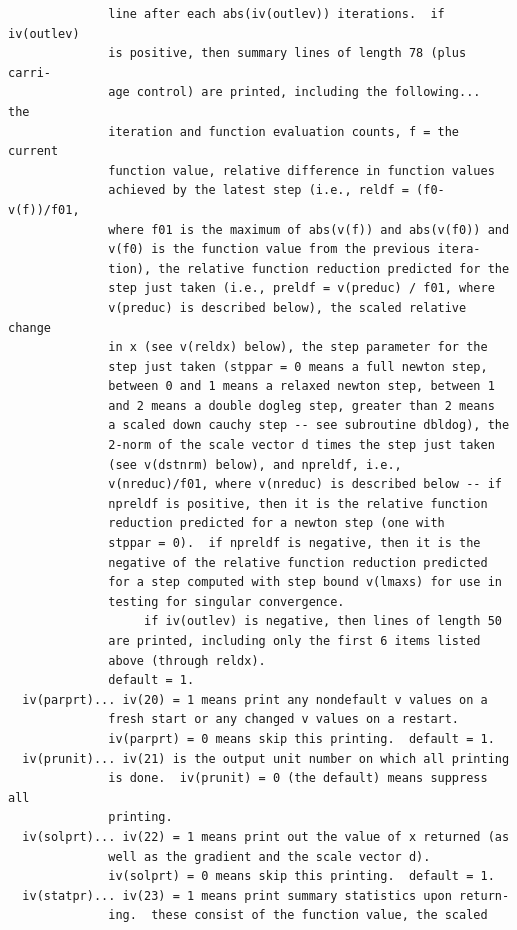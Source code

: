 \documentclass[11pt,twoside]{article}
\begin{document}
\begin{verbatim}
              line after each abs(iv(outlev)) iterations.  if iv(outlev)
              is positive, then summary lines of length 78 (plus carri-
              age control) are printed, including the following...  the
              iteration and function evaluation counts, f = the current
              function value, relative difference in function values
              achieved by the latest step (i.e., reldf = (f0-v(f))/f01,
              where f01 is the maximum of abs(v(f)) and abs(v(f0)) and
              v(f0) is the function value from the previous itera-
              tion), the relative function reduction predicted for the
              step just taken (i.e., preldf = v(preduc) / f01, where
              v(preduc) is described below), the scaled relative change
              in x (see v(reldx) below), the step parameter for the
              step just taken (stppar = 0 means a full newton step,
              between 0 and 1 means a relaxed newton step, between 1
              and 2 means a double dogleg step, greater than 2 means
              a scaled down cauchy step -- see subroutine dbldog), the
              2-norm of the scale vector d times the step just taken
              (see v(dstnrm) below), and npreldf, i.e.,
              v(nreduc)/f01, where v(nreduc) is described below -- if
              npreldf is positive, then it is the relative function
              reduction predicted for a newton step (one with
              stppar = 0).  if npreldf is negative, then it is the
              negative of the relative function reduction predicted
              for a step computed with step bound v(lmaxs) for use in
              testing for singular convergence.
                   if iv(outlev) is negative, then lines of length 50
              are printed, including only the first 6 items listed
              above (through reldx).
              default = 1.
  iv(parprt)... iv(20) = 1 means print any nondefault v values on a
              fresh start or any changed v values on a restart.
              iv(parprt) = 0 means skip this printing.  default = 1.
  iv(prunit)... iv(21) is the output unit number on which all printing
              is done.  iv(prunit) = 0 (the default) means suppress all 
              printing.
  iv(solprt)... iv(22) = 1 means print out the value of x returned (as
              well as the gradient and the scale vector d).
              iv(solprt) = 0 means skip this printing.  default = 1.
  iv(statpr)... iv(23) = 1 means print summary statistics upon return-
              ing.  these consist of the function value, the scaled

\end{verbatim}
\end{document}
